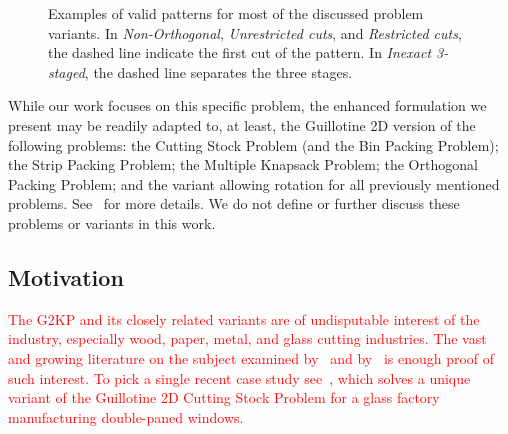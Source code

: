\documentclass[smallextended]{svjour3}       %
\newif\iffinalversion
\newcommand{\oldtext}[1]{\iffinalversion%
#1%
\else%
\textcolor{red}{#1}%
\fi%
}
\begin{document}
\begin{figure}

\caption{Examples of valid patterns for most of the discussed problem variants. In \emph{Non-Orthogonal}, \emph{Unrestricted cuts}, and \emph{Restricted cuts}, the dashed line indicate the first cut of the pattern. In \emph{Inexact 3-staged}, the dashed line separates the three stages.}
\label{fig:qualifier_examples}
\end{figure}

While our work focuses on this specific problem, the enhanced formulation we present may be readily adapted to, at least, the Guillotine 2D version of the following problems: the Cutting Stock Problem (and the Bin Packing Problem); the Strip Packing Problem; the Multiple Knapsack Problem; the Orthogonal Packing Problem; and the variant allowing rotation for all previously mentioned problems.
See~\cite{furini:2016} for more details.
We do not define or further discuss these problems or variants in this work.

\subsection{Motivation}

\oldtext{The G2KP and its closely related variants are of undisputable interest of the industry, especially wood, paper, metal, and glass cutting industries. The vast and growing literature on the subject examined by~\cite{iori:2020} and by~\cite{russo:2020} is enough proof of such interest.
To pick a single recent case study see~\cite{clautiaux:2019}, which solves a unique variant of the Guillotine 2D Cutting Stock Problem for a glass factory manufacturing double-paned windows.}
\end{document}
